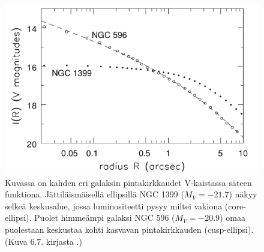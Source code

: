 \documentclass[12pt,a4paper]{article}
\begin{document}
\begin{figure}[h!tb]
\centering
\includegraphics[width=\textwidth]{../kuvat/keskustat.png}
\caption{Kuvassa on kahden eri galaksin pintakirkkaudet V-kaistassa säteen funktiona. Jättiläismäisellä ellipsillä NGC 1399 ($M_V = -21.7$) näkyy selkeä keskusalue, jossa luminositeetti pysyy miltei vakiona (core-ellipsi). Puolet himmeämpi galaksi NGC 596 ($M_V = -20.9$) omaa puolestaan keskustaa kohti kasvavan pintakirkkauden (cusp-ellipsi). (Kuva 6.7. kirjasta \cite{galaxies}.)}
\label{fig:keskustat}
\end{figure}
\end{document}
